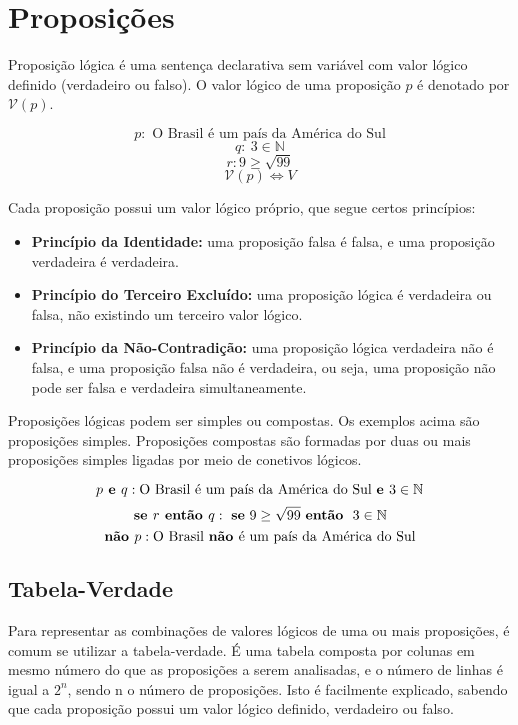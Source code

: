 \chapter{Proposições}
\begin{df}
Proposição lógica é uma sentença declarativa sem variável com valor lógico definido (verdadeiro ou falso). O valor lógico de uma proposição $p$ é denotado por $\mathcal{V}(p)$.
\end{df}
\begin{exemplo}
\[p:\text{ O Brasil é um país da América do Sul}\]
\[q:\ 3 \in \mathbb{N}\]
\[r: 9 \ge \sqrt{99} \]
\[\mathcal{V}(p)\Leftrightarrow V\]
\end{exemplo}

Cada proposição possui um valor lógico próprio, que segue certos princípios:
\begin{itemize}
	\item \textbf{Princípio da Identidade:} uma proposição falsa é falsa, e uma proposição verdadeira é verdadeira.
	\item \textbf{Princípio do Terceiro Excluído:} uma proposição lógica é verdadeira ou falsa, não existindo um terceiro valor lógico. 
	\item \textbf{Princípio da Não-Contradição:} uma proposição lógica verdadeira não é falsa, e uma proposição falsa não é verdadeira, ou seja, uma proposição não pode ser falsa e verdadeira simultaneamente.
\end{itemize}
Proposições lógicas podem ser simples ou compostas. Os exemplos acima são proposições simples. Proposições compostas são formadas por duas ou mais proposições simples ligadas por meio de conetivos lógicos.
\begin{exemplo}
\[p \textbf{ e } q: \text{O Brasil é um país da América do Sul \textbf{e }} 3 \in \mathbb{N}\]
\[\textbf{se } r \textbf{ então }q:\text{ \textbf{se} }  9 \ge \sqrt{99} \text{ \textbf{então} } \ 3 \in \mathbb{N}\]
\[\textbf{não } p: \text{O Brasil \textbf{não }é um país da América do Sul}\]
\end{exemplo}

\section{Tabela-Verdade}
Para representar as combinações de valores lógicos de uma ou mais proposições, é comum se utilizar a tabela-verdade. É uma tabela composta por colunas em mesmo número do que as proposições a serem analisadas, e o número de linhas é igual a \(2^n\), sendo n o número de proposições. Isto é facilmente explicado, sabendo que cada proposição possui um valor lógico definido, verdadeiro ou falso.


